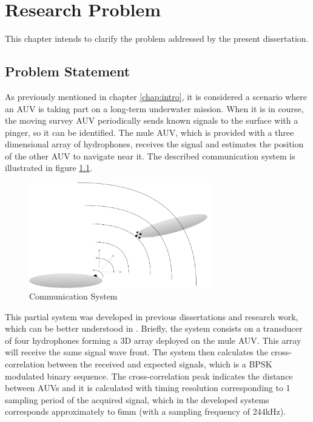 \chapter{Research Problem} \label{chap:problem}

This chapter intends to clarify the problem addressed by the present dissertation. 

\section{Problem Statement} \label{sec:prob-state}

As previously mentioned in chapter \ref{chap:intro}, it is considered a scenario where an AUV is taking part on a long-term underwater mission. When it is in course, the moving survey AUV periodically sends known signals to the surface with a pinger, so it can be identified. The mule AUV, which is provided with a three dimensional array of hydrophones, receives the signal and estimates the position of the other AUV to navigate near it. The described communication system is illustrated in figure \ref{fig:auv_scene}. 

\begin{figure}[!htbp]
	\centering
	\includegraphics[width=0.7\textwidth]{figures/proposed-solution}
	\caption{Communication System}
	\label{fig:auv_scene}
\end{figure}

This partial system was developed in previous dissertations and research work, which can be better understood in \cite{afonso-thesis}. Briefly, the system consists on a transducer of four hydrophones forming a 3D array deployed on the mule AUV. This array will receive the same signal wave front. The system then calculates the cross-correlation between the received and expected signals, which is a BPSK modulated binary sequence. The cross-correlation peak indicates the distance between AUVs and it is calculated with timing resolution corresponding to 1 sampling period of the acquired signal, which in the developed systems corresponds approximately to 6mm (with a sampling frequency of 244kHz).

